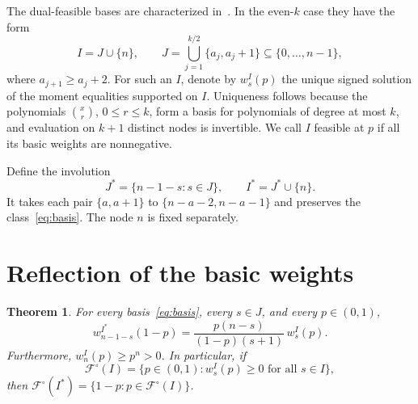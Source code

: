 \documentclass[11pt]{article}
\newtheorem{theorem}{Theorem}
\theoremstyle{remark}
\newcommand{\Fint}{\mathcal F^{\circ}}
\begin{document}
The dual-feasible bases are characterized in~\cite[Theorem 3.3]{BEKK}. In the even-$k$ case they have the form
\begin{equation}\label{eq:basis}
 I=J\cup\{n\},\qquad
 J=\bigcup_{j=1}^{k/2}\{a_j,a_j+1\}\subseteq\{0,\ldots,n-1\},
\end{equation}
where $a_{j+1}\ge a_j+2$. For such an $I$, denote by $w_s^I(p)$ the unique signed solution of the moment equalities supported on $I$.
Uniqueness follows because the polynomials $\binom{x}{r}$, $0\le r\le k$, form a basis for polynomials of degree at most $k$, and evaluation on $k+1$ distinct nodes is invertible. We call $I$ feasible at $p$ if all its basic weights are nonnegative.

Define the involution
\begin{equation}\label{eq:star}
 J^*=\{n-1-s:s\in J\},\qquad I^*=J^*\cup\{n\}.
\end{equation}
It takes each pair $\{a,a+1\}$ to $\{n-a-2,n-a-1\}$ and preserves the class~\eqref{eq:basis}. The node $n$ is fixed separately.

\section{Reflection of the basic weights}

\begin{theorem}\label{thm:identity}
For every basis~\eqref{eq:basis}, every $s\in J$, and every $p\in(0,1)$,
\begin{equation}\label{eq:identity}
 w_{n-1-s}^{I^*}(1-p)
 =\frac{p(n-s)}{(1-p)(s+1)}\,w_s^I(p).
\end{equation}
Furthermore, $w_n^I(p)\ge p^n>0$.
In particular, if
\[
 \Fint(I)=\{p\in(0,1):w_s^I(p)\ge0\text{ for all }s\in I\},
\]
then $\Fint(I^*)=\{1-p:p\in\Fint(I)\}$.
\end{theorem}
\end{document}
